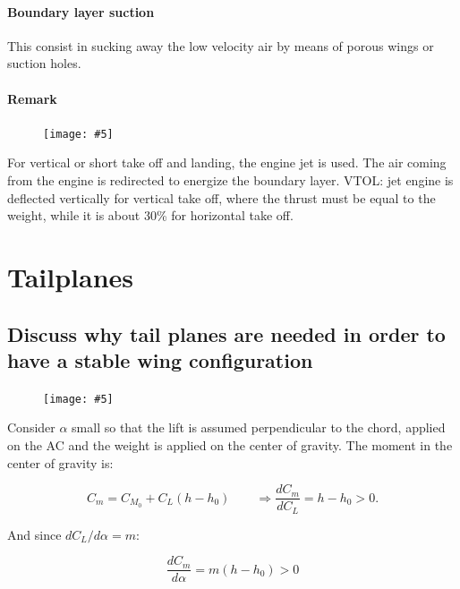 \documentclass[british,french,11pt, a4paper, openany]{article}
\newcommand{\wrapfig}[6]{%
	\begin{figure}%
		\vspace{-5mm}%
		\texttt{[image: \#5]}%
		\captionof{figure}{}%
		\label{#6}%
	\end{figure}%
}
\begin{document}
\paragraph{Boundary layer suction}
This consist in sucking away the low velocity air by means of porous wings or suction holes. 

\paragraph{Remark}
\wrapfig{6}{l}{5}{0.15}{ch5/12}{ch5/12}
For vertical or short take off and landing, the engine jet is used. The air coming from the engine is redirected to energize the boundary layer. VTOL: jet engine is deflected vertically for vertical take off, where the thrust must be equal to the weight, while it is about 30\% for horizontal take off. 





\section{Tailplanes}

\subsection{Discuss why tail planes are needed in order to have a stable wing configuration}

\wrapfig{6}{r}{3.5}{0.15}{ch5/13}{ch5/13}
Consider $\alpha$ small so that the lift is assumed perpendicular to the chord, applied on the AC and the weight is applied on the center of gravity. The moment in the center of gravity is:

\begin{equation}
C_m = C_{M_0} + C_L (h-h_0) \qquad \Rightarrow \frac{dC_m}{dC_L} = h -h_0 > 0.
\end{equation}	 

And since $dC_L/d\alpha = m$:

\begin{equation}
\frac{dC_m}{d\alpha} = m(h-h_0)>0
\end{equation}
\end{document}
